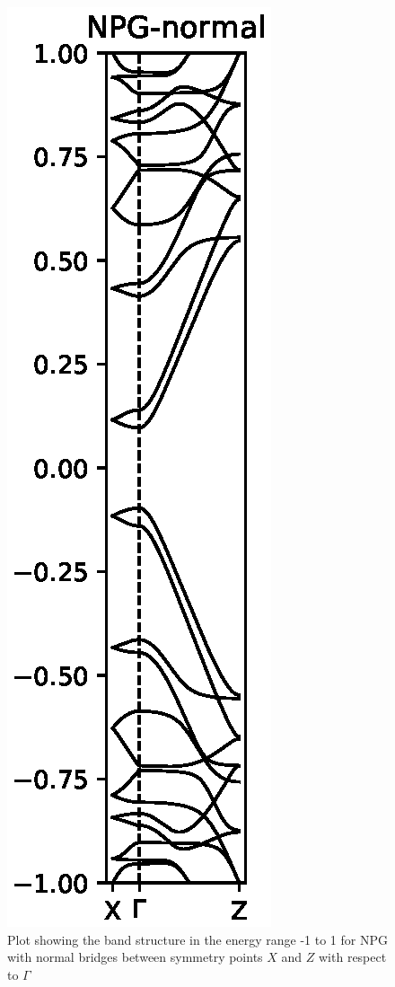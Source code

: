\begin{figure}[H]
	\centering
	\includegraphics{Figures/FabNPGBS.eps}
	\caption{Plot showing the band structure in the energy range -1 to 1 for NPG with normal bridges between symmetry points \(X\) and \(Z\) with respect to \(\Gamma\)}
	\label{Fab}
\end{figure}

